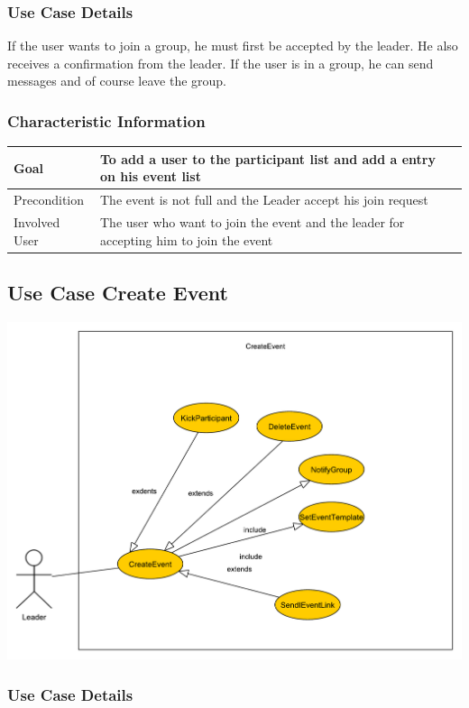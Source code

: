 \documentclass[12pt]{article}
\theoremstyle{definition}
\begin{document}
\subsubsection{Use Case Details}

If the user wants to join a group, he must first be accepted by the leader. He also receives a confirmation from the leader. If the user is in a group, he can send messages and of course leave the group.
\subsubsection{Characteristic Information}

\begin{tabular}{|l|l|}
\hline
Goal & To add a user to the participant list and add a entry on his event list \\ \hline
Precondition &  The event is not full and the Leader accept his join request\\ \hline
Involved User &  The user who want to join the event and the leader for accepting him to join the event\\ \hline

\end{tabular}


\subsection{Use Case Create Event}

\includegraphics[scale=.5]{Usecase/CreateEvent.pdf}

\subsubsection{Use Case Details}
\end{document}
